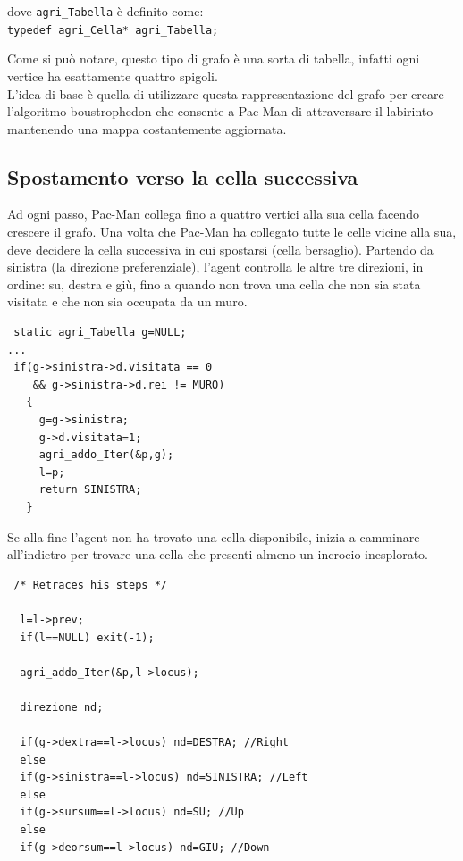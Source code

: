 \documentclass[8pt]{book}
\begin{document}
dove \texttt{agri\_Tabella} è definito come: \\\texttt{typedef agri\_Cella* agri\_Tabella;}

Come si può notare, questo tipo di grafo è una sorta di tabella, infatti ogni vertice ha esattamente quattro spigoli.\\
L'idea di base è quella di utilizzare questa rappresentazione del grafo per creare l'algoritmo boustrophedon che consente a Pac-Man di attraversare il labirinto mantenendo una mappa costantemente aggiornata.

\subsection{Spostamento verso la cella successiva}\label{tocux5f31}

Ad ogni passo, Pac-Man collega fino a quattro vertici alla sua cella facendo crescere il grafo. Una volta che Pac-Man ha collegato tutte le celle vicine alla sua, deve decidere la cella successiva in cui spostarsi (cella bersaglio). Partendo da sinistra (la direzione preferenziale), l'agent controlla le altre tre direzioni, in ordine: su, destra e giù, fino a quando non trova una cella che non sia stata visitata e che non sia occupata da un muro.

  \begin{spacing}{0.9}
    \begin{small}
      \begin{tcolorbox}
\begin{verbatim}
 static agri_Tabella g=NULL;
...
 if(g->sinistra->d.visitata == 0
    && g->sinistra->d.rei != MURO) 
   {
     g=g->sinistra;
     g->d.visitata=1;
     agri_addo_Iter(&p,g);
     l=p;
     return SINISTRA;
   }
\end{verbatim}
    \end{tcolorbox}
  \end{small}
\end{spacing}

Se alla fine l'agent non ha trovato una cella disponibile, inizia a camminare all'indietro per trovare una cella che presenti almeno un incrocio inesplorato.

  \begin{spacing}{0.9}
    \begin{small}
      \begin{tcolorbox}
\begin{verbatim}
 /* Retraces his steps */

  l=l->prev;
  if(l==NULL) exit(-1);
  
  agri_addo_Iter(&p,l->locus);
  
  direzione nd;

  if(g->dextra==l->locus) nd=DESTRA; //Right
  else
  if(g->sinistra==l->locus) nd=SINISTRA; //Left
  else
  if(g->sursum==l->locus) nd=SU; //Up
  else
  if(g->deorsum==l->locus) nd=GIU; //Down
\end{verbatim}
    \end{tcolorbox}
  \end{small}
\end{spacing}
\end{document}
